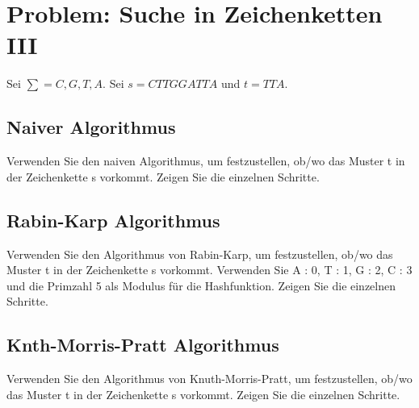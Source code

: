 \section{Problem: Suche in Zeichenketten III}

 Sei $\sum = C, G, T, A.$ Sei $s = CTTGGATTA$ und $t = TTA$.



\subsection{Naiver Algorithmus}
Verwenden Sie den naiven Algorithmus, um festzustellen, ob/wo das Muster t
in der Zeichenkette s vorkommt.
Zeigen Sie die einzelnen Schritte.

\subsection{Rabin-Karp Algorithmus}
Verwenden Sie den Algorithmus von Rabin-Karp, um festzustellen, ob/wo das
Muster t in der Zeichenkette s vorkommt. Verwenden Sie A : 0, T : 1, G : 2, C :
3 und die Primzahl 5 als Modulus für die Hashfunktion.
Zeigen Sie die einzelnen Schritte.

\subsection{Knth-Morris-Pratt Algorithmus}
Verwenden Sie den Algorithmus von Knuth-Morris-Pratt, um festzustellen,
ob/wo das Muster t in der Zeichenkette s vorkommt.
Zeigen Sie die einzelnen Schritte.
